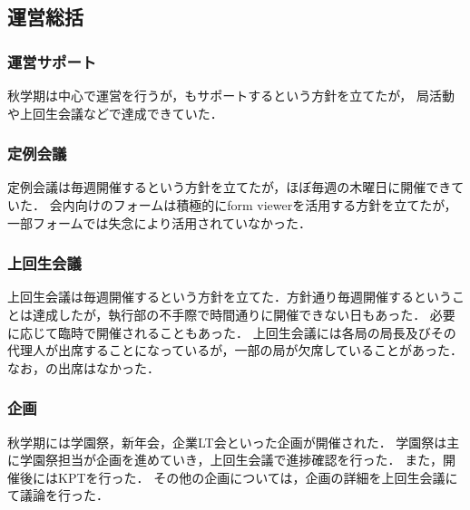 \subsection*{運営総括}


\subsubsection*{運営サポート}
秋学期は\secondGrade{}中心で運営を行うが，\thirdGrade{}もサポートするという方針を立てたが，
局活動や上回生会議などで達成できていた．

\subsubsection*{定例会議}
定例会議は毎週開催するという方針を立てたが，ほぼ毎週の木曜日に開催できていた．
会内向けのフォームは積極的にform viewerを活用する方針を立てたが，一部フォームでは失念により活用されていなかった．

\subsubsection*{上回生会議}
上回生会議は毎週開催するという方針を立てた．方針通り毎週開催するということは達成したが，執行部の不手際で時間通りに開催できない日もあった．
必要に応じて臨時で開催されることもあった．
上回生会議には各局の局長及びその代理人が出席することになっているが，一部の局が欠席していることがあった．
なお，\firstGrade{}の出席はなかった．

\subsubsection*{企画}
秋学期には学園祭，新年会，企業LT会といった企画が開催された．
学園祭は主に学園祭担当が企画を進めていき，上回生会議で進捗確認を行った．
また，開催後にはKPTを行った．
その他の企画については，企画の詳細を上回生会議にて議論を行った．
